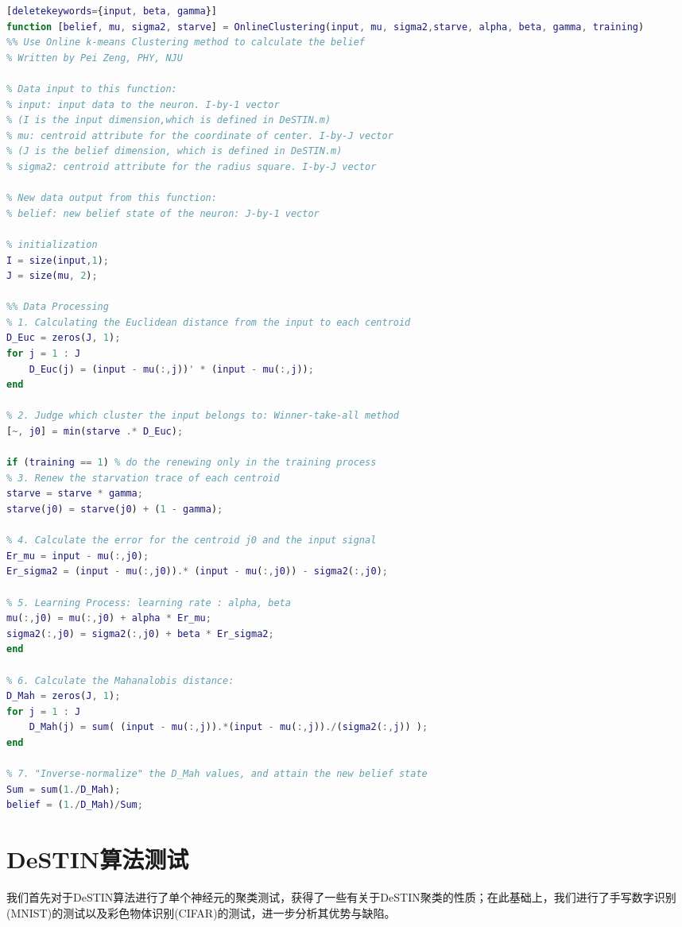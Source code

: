 \begin{spacing}{1}
\begin{lstlisting}[language=Matlab][deletekeywords={input, beta, gamma}]
function [belief, mu, sigma2, starve] = OnlineClustering(input, mu, sigma2,starve, alpha, beta, gamma, training)
%% Use Online k-means Clustering method to calculate the belief
% Written by Pei Zeng, PHY, NJU

% Data input to this function: 
% input: input data to the neuron. I-by-1 vector 
% (I is the input dimension,which is defined in DeSTIN.m)
% mu: centroid attribute for the coordinate of center. I-by-J vector
% (J is the belief dimension, which is defined in DeSTIN.m)
% sigma2: centroid attribute for the radius square. I-by-J vector

% New data output from this function:
% belief: new belief state of the neuron: J-by-1 vector

% initialization
I = size(input,1);
J = size(mu, 2);

%% Data Processing
% 1. Calculating the Euclidean distance from the input to each centroid
D_Euc = zeros(J, 1);
for j = 1 : J
    D_Euc(j) = (input - mu(:,j))' * (input - mu(:,j));
end

% 2. Judge which cluster the input belongs to: Winner-take-all method
[~, j0] = min(starve .* D_Euc);

if (training == 1) % do the renewing only in the training process
% 3. Renew the starvation trace of each centroid
starve = starve * gamma;
starve(j0) = starve(j0) + (1 - gamma);

% 4. Calculate the error for the centroid j0 and the input signal
Er_mu = input - mu(:,j0);
Er_sigma2 = (input - mu(:,j0)).* (input - mu(:,j0)) - sigma2(:,j0);

% 5. Learning Process: learning rate : alpha, beta
mu(:,j0) = mu(:,j0) + alpha * Er_mu;
sigma2(:,j0) = sigma2(:,j0) + beta * Er_sigma2;
end

% 6. Calculate the Mahanalobis distance:
D_Mah = zeros(J, 1);
for j = 1 : J
    D_Mah(j) = sum( (input - mu(:,j)).*(input - mu(:,j))./(sigma2(:,j)) );
end

% 7. "Inverse-normalize" the D_Mah values, and attain the new belief state
Sum = sum(1./D_Mah);
belief = (1./D_Mah)/Sum;

\end{lstlisting}
\end{spacing}


\section{DeSTIN算法测试}
我们首先对于DeSTIN算法进行了单个神经元的聚类测试，获得了一些有关于DeSTIN聚类的性质；在此基础上，我们进行了手写数字识别(MNIST)的测试以及彩色物体识别(CIFAR)的测试，进一步分析其优势与缺陷。

